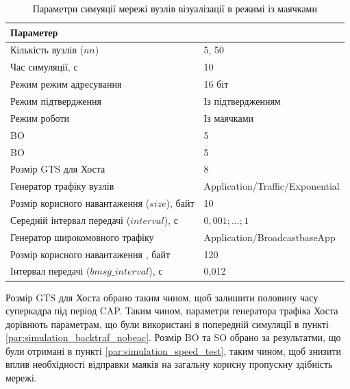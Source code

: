 \documentclass[a4paper,ukrainian,utf8,nocolumnsxix,floatsection,equationsection]{eskdtext}
\begin{document}
\begin{table}[htbp]
\caption{Параметри симуяції мережі вузлів візуалізації в режимі із маячками}
\centering
\begin{tabular}{|l|l|}
	\hline
	Параметер                                    &                                 \\ \hline
	Кількість вузлів ($nn$)                      & 5, 50                           \\ \hline
	Час симуляції, с                             & 10                              \\ \hline
	Режим режим адресування                      & 16 біт                          \\ \hline
	Режим підтвердження                          & Із підтвердженням               \\ \hline
	Режим роботи                                 & Із маячками                     \\ \hline
	BO                                           & 5                               \\ \hline
	BO                                           & 5                               \\ \hline
	Розмір GTS для Хоста                         & 8                               \\ \hline
	Генератор трафіку вузлів                     & Application/Traffic/Exponential \\ \hline
	Розмір корисного навантаження ($size$), байт & 10                              \\ \hline
	Середній інтервал передачі ($interval$), с   & $0,001;\dots;1$                 \\ \hline
	Генератор широкомовного трафіку              & Application/BroadcastbaseApp    \\ \hline
	Розмір корисного навантаження , байт         & 120                             \\ \hline
	Інтервал передачі ($bmsg\_interval$), с      & 0,012                           \\ \hline
\end{tabular}
\label{tbl:simulation_backtraf_beac_brd}
\end{table}

Розмір GTS для Хоста обрано таким чином, щоб залишити половину часу суперкадра під період CAP. Таким чином, параметри генератора  трафіка Хоста  дорівнють параметрам, що були використані в попередній симуляції в пункті \ref{par:simulation_backtraf_nobeac}. Розмір BO та SO обрано за результатми, що були отримані в пункті \ref{par:simulation_speed_test}, таким чином, щоб знизити вплив необхідності відправки маяків на загальну корисну пропускну здібність мережі.
\end{document}
